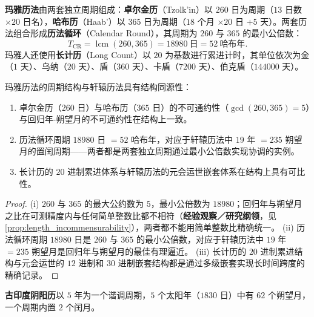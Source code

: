 \begin{definition}[玛雅历法的周期结构]\label{def:maya_calendar}
\textbf{玛雅历法}由两套独立周期组成：\textbf{卓尔金历}（Tzolk'in）以 \(260\) 日为周期（\(13\) 日数 \(\times 20\) 日名），\textbf{哈布历}（Haab'）以 \(365\) 日为周期（\(18\) 个月 \(\times 20\) 日 \(+5\) 天）。两套历法组合形成\textbf{历法循环}（Calendar Round），其周期为 \(260\) 与 \(365\) 的最小公倍数：
\[
T_{\text{CR}}=\operatorname{lcm}(260,365)=18980\ \text{日}=52\ \text{哈布年}.
\]
玛雅人还使用\textbf{长计历}（Long Count）以 \(20\) 为基数进行累进计时，其单位依次为金（\(1\) 天）、乌纳（\(20\) 天）、盾（\(360\) 天）、卡盾（\(7200\) 天）、伯克盾（\(144000\) 天）。
\end{definition}

\begin{proposition}[玛雅历法的周期协调]\label{prop:maya_calendar_coordination}
玛雅历法的周期结构与轩辕历法具有结构同源性：
\begin{enumerate}[label=(\roman*)]
    \item 卓尔金历（\(260\) 日）与哈布历（\(365\) 日）的不可通约性（\(\gcd(260,365)=5\)）与回归年-朔望月的不可通约性在结构上一致。
    \item 历法循环周期 \(18980\) 日 \(=52\) 哈布年，对应于轩辕历法中 \(19\) 年 \(=235\) 朔望月的置闰周期——两者都是两套独立周期通过最小公倍数实现协调的实例。
    \item 长计历的 \(20\) 进制累进体系与轩辕历法的元会运世嵌套体系在结构上具有可比性。
\end{enumerate}
\end{proposition}

\begin{proof}
(i) \(260\) 与 \(365\) 的最大公约数为 \(5\)，最小公倍数为 \(18980\)；回归年与朔望月之比在可测精度内与任何简单整数比都不相符（\textbf{经验观察／研究纲领}，见 \cref{prop:length_incommensurability}），两者都不能用简单整数比精确统一。
(ii) 历法循环周期 \(18980\) 日是 \(260\) 与 \(365\) 的最小公倍数，对应于轩辕历法中 \(19\) 年 \(=235\) 朔望月是回归年与朔望月的最佳有理逼近。
(iii) 长计历的 \(20\) 进制累进结构与元会运世的 \(12\) 进制和 \(30\) 进制嵌套结构都是通过多级嵌套实现长时间跨度的精确记录。
\end{proof}

\begin{definition}[古印度阴阳历]\label{def:indian_calendar}
\textbf{古印度阴阳历}以 \(5\) 年为一个谐调周期，\(5\) 个太阳年（\(1830\) 日）中有 \(62\) 个朔望月，一个周期内置 \(2\) 个闰月。
\end{definition}

